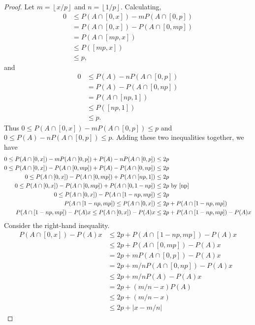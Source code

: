 \documentclass[letterpaper, 12pt]{article}
\newcommand{\lf}{\left\lfloor}
\newcommand{\rf}{\right\rfloor}
\begin{document}
\begin{proof}
Let $m = \lf x/p \rf$ and $n = \lf 1/p \rf$.
Calculating,
\begin{align*}
0 &\leq P(A \cap [0,x]) - m P(A \cap [0,p]) \\
&= P(A \cap [0,x]) - P(A \cap [0,mp]) \\
&= P(A \cap [mp, x]) \\
&\leq P([mp,x]) \\
&\leq p
\text{,}
\end{align*}
and
\begin{align*}
0 &\leq P(A) - n P(A \cap [0,p]) \\
&= P(A) - P(A \cap [0,np]) \\
&= P(A \cap [np, 1]) \\
&\leq P([np,1]) \\
&\leq p
\text{.}
\end{align*}
Thus $0 \leq P(A \cap [0,x]) - m P(A \cap [0,p]) \leq p$ and $0 \leq P(A) - nP(A \cap [0,p]) \leq p$. Adding these two inequalities together, we have 
\begin{align*}
0 \leq P(A \cap [0,x]) - m P(A \cap [0,p]) + P(A) - nP(A \cap [0,p]) &\leq 2p \\ 
0 \leq P(A \cap [0,x]) -  P(A \cap [0,mp]) + P(A) - P(A \cap [0,np]) &\leq 2p \\
0 \leq P(A \cap [0,x]) -  P(A \cap [0,mp]) + P(A \cap [np,1]) &\leq 2p \\
0 \leq P(A \cap [0,x]) -  P(A \cap [0,mp]) + P(A \cap [0,1-np]) &\leq 2p 
\text{ by \eqref{np}} \\
0 \leq P(A \cap [0,x]) -  P(A \cap [1 - np,mp]) &\leq 2p \\
P(A \cap [1 - np,mp]) \leq P(A \cap [0,x])  &\leq 2p + P(A \cap [1 - np,mp]) \\ 
P(A \cap [1 - np,mp]) - P(A)x \leq P(A \cap [0,x]) - P(A)x  &\leq 2p + P(A \cap [1 - np,mp]) - P(A)x
\end{align*}
Consider the right-hand inequality.
\begin{align*}
P(A \cap [0,x]) - P(A)x  &\leq 2p + P(A \cap [1 - np,mp]) - P(A)x \\
 &\leq 2p + P(A \cap [0,mp]) - P(A)x \\
 &= 2p + m P(A \cap [0,p]) - P(A)x \\
 &= 2p + m/n P(A \cap [0,np]) - P(A)x \\
 &\leq 2p + m/n P(A) - P(A)x \\
 &= 2p + (m/n - x)P(A) \\
 &\leq 2p + (m/n - x) \\
 &\leq 2p + | x - m/n | 

\end{align*}
\end{proof}
\end{document}
